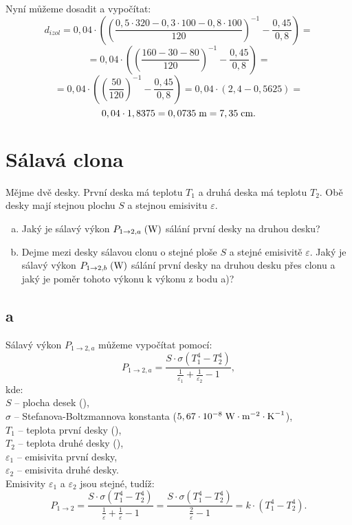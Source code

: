 \documentclass{article}
\begin{document}
Nyní můžeme dosadit a vypočítat:
$$
    d_{izol} = 0,04 \cdot \left( \left( \frac{0,5 \cdot 320 - 0,3 \cdot 100 - 0,8 \cdot 100}{120} \right)^{-1} - \frac{0,45}{0,8} \right) =
$$
$$
    = 0,04 \cdot \left( \left( \frac{160 - 30 - 80}{120} \right)^{-1} - \frac{0,45}{0,8} \right) =
$$
$$
    = 0,04 \cdot \left( \left( \frac{50}{120} \right)^{-1} - \frac{0,45}{0,8} \right) = 0,04 \cdot (2,4 - 0,5625) =
$$
$$
    0,04 \cdot 1,8375 = 0,0735 \; \textrm{m} = 7,35 \; \textrm{cm}.
$$

\newpage




\section{ Sálavá clona \spicy \spicy}
Mějme dvě desky. První deska má teplotu $T_1$ a druhá deska má teplotu $T_2$. Obě desky mají stejnou plochu $S$ a stejnou emisivitu $\varepsilon$.
\begin{enumerate}[a)]
    \item Jaký je sálavý výkon $P_{1 \rightarrow 2,a} \; (\textrm{W})$ sálání první desky na druhou desku?
    \item Dejme mezi desky sálavou clonu o stejné ploše $S$ a stejné emisivitě $\varepsilon$. Jaký je sálavý výkon $P_{1 \rightarrow 2,b} \; (\textrm{W})$ sálání první desky na druhou desku přes clonu a jaký je poměr tohoto výkonu k výkonu z bodu a)?
\end{enumerate}



\subsection{a}
Sálavý výkon $P_{1 \rightarrow 2,a}$ můžeme vypočítat pomocí:
$$
    P_{1 \rightarrow 2,a} = \frac{S \cdot \sigma \left( T_1^4 - T_2^4 \right)}{\frac{1}{\varepsilon_1} + \frac{1}{\varepsilon_2} - 1},
$$
kde:\\
$S$ -- plocha desek (\ueqMsq),\\
$\sigma$ -- Stefanova-Boltzmannova konstanta ($5,67 \cdot 10^{-8} \; \textrm{W} \cdot \textrm{m}^{-2} \cdot \textrm{K}^{-1}$),\\
$T_1$ -- teplota první desky (\uK),\\
$T_2$ -- teplota druhé desky (\uK),\\
$\varepsilon_1$ -- emisivita první desky,\\
$\varepsilon_2$ -- emisivita druhé desky.\\

Emisivity $\varepsilon_1$ a $\varepsilon_2$ jsou stejné, tudíž:
$$
    P_{1 \rightarrow 2} = \frac{S \cdot \sigma \left( T_1^4 - T_2^4 \right)}{\frac{1}{\varepsilon} + \frac{1}{\varepsilon} - 1} = \frac{S \cdot \sigma \left( T_1^4 - T_2^4 \right)}{\frac{2}{\varepsilon} - 1} = k \cdot \left( T_1^4 - T_2^4 \right).
$$
\end{document}
